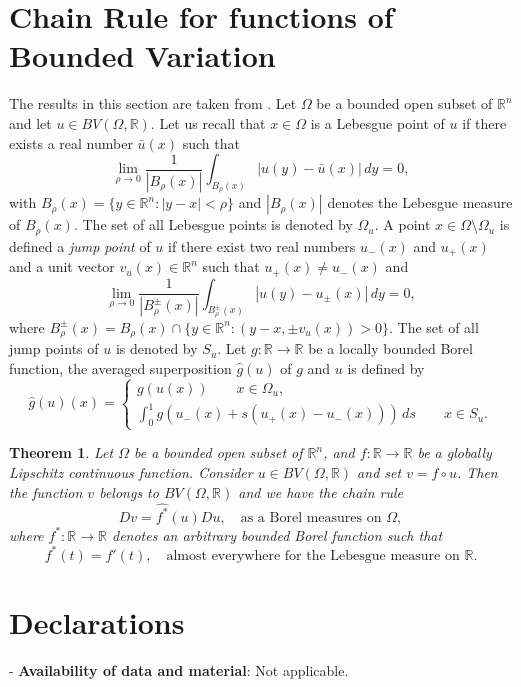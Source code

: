 \documentclass[11pt,a4paper,oneside]{amsart}
\newtheorem{theorem}[definition]{Theorem}
\newcommand\R{\mathbb{R}}
\begin{document}
\section{Chain Rule for functions of Bounded Variation}
The results in this section are taken from \cite{DalMaso-LF-Murat}.
Let $\Omega$ be a bounded open subset of $\R^n$ and let $u\in BV(\Omega,\R)$. 
Let us recall that $x\in\Omega$ is a Lebesgue point of $u$ if there exists a real number $\bar u(x)$ such that
$$
\lim_{\rho\to0}\frac{1}{|B_\rho(x)|}\int_{B_\rho(x)}|u(y)-\bar u(x)|\,dy=0,
$$
with $B_\rho(x)=\{y\in \R^n:|y-x|<\rho\}$ and $|B_\rho(x)|$ denotes the Lebesgue measure of $B_\rho(x)$. 
The set of all Lebesgue points is denoted by $\Omega_u$. A point $x\in\Omega\setminus\Omega_u$ is defined 
a \emph{jump point} of $u$ if there exist two real numbers $u_-(x)$ and $u_+(x)$ and a unit vector $v_u(x)\in\R^n$ 
such that $u_+(x)\neq u_-(x)$ and
$$
\lim_{\rho\to0}\frac{1}{|B^\pm_\rho(x)|}\int_{B^\pm_\rho(x)}|u(y)-u_\pm(x)|\,dy=0,
$$
where $B^\pm_\rho(x)=B_\rho(x)\cap\{y\in\R^n:(y-x,\pm v_u(x))>0\}.$ The set of all jump points of $u$ is denoted by $S_u$. 
Let $g:\R\to\R$ be a locally bounded Borel function, the averaged superposition $\hat{g}(u)$ of $g$ and $u$ is defined by
\begin{equation}\label{def:superposition}
    \hat{g}(u)(x)=\begin{cases}
        g(u(x))\qquad x\in\Omega_u,\\
        \int_0^1 g(u_-(x)+s(u_+(x)-u_-(x)))\,ds\qquad x\in S_u.
    \end{cases}
\end{equation}
\begin{theorem}\label{th:chain-rule}
Let $\Omega$ be a bounded open subset of $\R^n$, and $f:\R\to\R$ be a globally Lipschitz continuous function. 
Consider $u\in BV(\Omega,\R)$ and set $v=f\circ u$. Then the function $v$ belongs to $BV(\Omega,\R)$ and we have the chain rule
$$
Dv=\hat{f^*}(u)Du,\quad\text{as a Borel measures on $\Omega$},
$$
where $f^*:\R\to\R$ denotes an arbitrary bounded Borel function such that
$$
f^*(t)=f'(t),\quad\text{almost everywhere for the Lebesgue measure on $\R$}.
$$
\end{theorem}


\section*{Declarations}

- {\bf Availability of data and material}: Not applicable.
\end{document}
